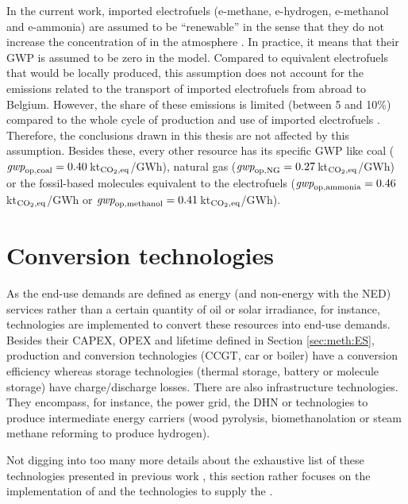 In the current work, imported electrofuels (\ie e-methane, e-hydrogen, e-methanol and e-ammonia) are assumed to be ``renewable'' in the sense that they do not increase the concentration of  in the atmosphere \cite{rixhon2021terminology}. In practice, it means that their \gls{GWP} is assumed to be zero in the model. Compared to equivalent electrofuels that would be locally produced, this assumption does not account for the emissions related to the transport of imported electrofuels from abroad to Belgium. However, the share of these emissions is limited (between 5 and 10\%) compared to the whole cycle of production and use of imported electrofuels \cite{coppitters2024towards}. Therefore, the conclusions drawn in this thesis are not affected by this assumption. Besides these, every other resource has its specific \gls{GWP} like coal ($\emph{gwp}_{\mathrm{op,coal}}=0.40$\,kt$_{\ce{CO2},\text{eq}}$/GWh), natural gas ($\emph{gwp}_{\mathrm{op,NG}}=0.27$\,kt$_{\ce{CO2},\text{eq}}$/GWh) or the fossil-based molecules equivalent to the electrofuels (\eg $\emph{gwp}_{\mathrm{op,ammonia}}=0.46$\,kt$_{\ce{CO2},\text{eq}}$/GWh or $\emph{gwp}_{\mathrm{op,methanol}}=0.41$\,kt$_{\ce{CO2},\text{eq}}$/GWh).


\section{Conversion technologies}
\label{sec:cs:technologies}
As the end-use demands are defined as energy (and non-energy with the \gls{NED}) services rather than a certain quantity of oil or solar irradiance, for instance, technologies are implemented to convert these resources into end-use demands. Besides their CAPEX, OPEX and lifetime defined in Section \ref{sec:meth:ES}, production and conversion technologies (\ie \gls{CCGT}, car or boiler) have a conversion efficiency whereas storage technologies (\ie thermal storage, battery or molecule storage) have charge/discharge losses. There are also infrastructure technologies. They encompass, for instance, the power grid, the \gls{DHN} or technologies to produce intermediate energy carriers (\eg wood pyrolysis, biomethanolation or steam methane reforming to produce hydrogen). 

Not digging into too many more details about the exhaustive list of these technologies presented in previous work \cite{limpens2021generating}, this section rather focuses on the implementation of  and the technologies to supply the .

